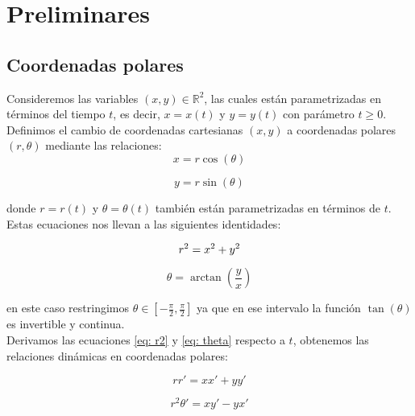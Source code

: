 \chapter{Preliminares}

\section{Coordenadas polares}

Consideremos las variables $(x,y)\in\mathbb{R}^2$, las cuales están parametrizadas en términos del tiempo $t$, es decir, $x=x(t)$ y $y=y(t)$ con parámetro $t\geq0$. Definimos el cambio de coordenadas cartesianas $(x,y)$
a coordenadas polares $(r,\theta)$ mediante las relaciones:
\begin{equation}\label{eq: xpolar}
	x=r\cos(\theta)
\end{equation}

\begin{equation}\label{eq: ypolar}
	y=r\sin(\theta)
\end{equation}

donde $r=r(t)$ y $\theta=\theta(t)$ también están parametrizadas en términos de $t$.\\

Estas ecuaciones nos llevan a las siguientes identidades:

\begin{equation}\label{eq: r2}
	r^2=x^2+y^2\\
\end{equation}

\begin{equation}\label{eq: theta}
	\theta=\arctan{(\frac{y}{x})}
\end{equation}

en este caso restringimos $\theta\in\left[-\frac{\pi}{2},\frac{\pi}{2}\right]$ ya que en ese intervalo la función $\tan\left(\theta\right)$ es invertible y continua.\\

Derivamos las ecuaciones \eqref{eq: r2} y \eqref{eq: theta} respecto a $t$, obtenemos las relaciones dinámicas en coordenadas polares:

\begin{equation}\label{eq: drcart}
	rr'=xx'+yy'
\end{equation}

\begin{equation}\label{eq: dthetacart}
	r^2\theta'=xy'-yx'
\end{equation}

